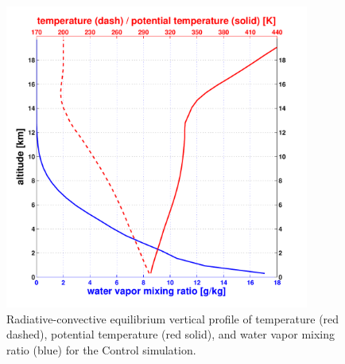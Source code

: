\documentclass[12pt]{article}
\begin{document}
{}
{\clearpage}



\begin{figure}[h!]
\centering
  \noindent\includegraphics[width=10cm,height=10cm]{FIGURES_TC_RCE_equilibrium_v2.0/Fig0half_Sounding_ctrl.pdf}
\caption{Radiative-convective equilibrium vertical profile of temperature (red dashed), potential temperature (red solid), and water vapor mixing ratio (blue) for the Control simulation.}
\label{fig:ctrlsounding}
\end{figure}
\end{document}
